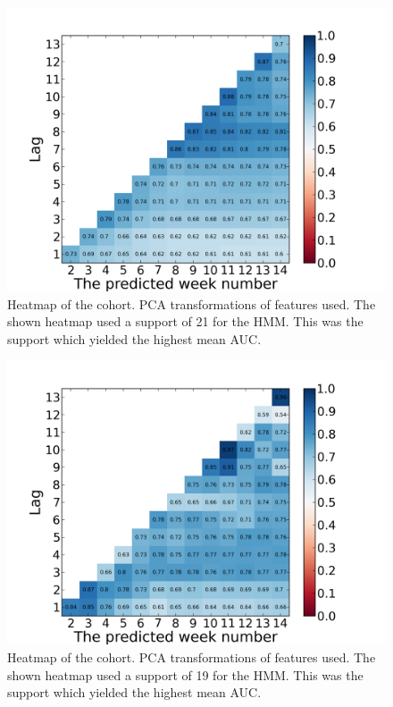 \begin{figure}[ht!]
  \caption{Heatmap of the \forum cohort. PCA transformations of features used. The shown heatmap used a support of 21 for the HMM. This was the support which yielded the highest mean AUC.}\label{fig:hmm_logreg_heatmap_forum_only}
  \centering
    \includegraphics[width=1.0\textwidth]{figures/hmm_logreg/forum_only_pca_support_21.png}
\end{figure}

\begin{figure}[ht!]
  \caption{Heatmap of the \both cohort. PCA transformations of features used. The shown heatmap used a support of 19 for the HMM. This was the support which yielded the highest mean AUC.}\label{fig:hmm_logreg_heatmap_forum_and_wiki}
  \centering
    \includegraphics[width=1.0\textwidth]{figures/hmm_logreg/forum_and_wiki_pca_support_19.png}
\end{figure}

